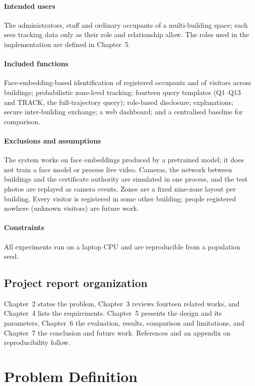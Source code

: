 \documentclass[12pt,a4paper,oneside]{report}
\begin{document}
\subsubsection{Intended users}
The administrators, staff and ordinary occupants of a multi-building space; each sees tracking data only as their role and relationship allow. The roles used in the implementation are defined in Chapter~5.

\subsubsection{Included functions}
Face-embedding-based identification of registered occupants and of visitors across buildings; probabilistic zone-level tracking; fourteen query templates (Q1--Q13 and TRACK, the full-trajectory query); role-based disclosure; explanations; secure inter-building exchange; a web dashboard; and a centralised baseline for comparison.

\subsubsection{Exclusions and assumptions}
The system works on face embeddings produced by a pretrained model; it does not train a face model or process live video. Cameras, the network between buildings and the certificate authority are simulated in one process, and the test photos are replayed as camera events. Zones are a fixed nine-zone layout per building. Every visitor is registered in some other building; people registered nowhere (unknown visitors) are future work.

\subsubsection{Constraints}
All experiments run on a laptop CPU and are reproducible from a population seed.

\section{Project report organization}
Chapter~2 states the problem, Chapter~3 reviews fourteen related works, and Chapter~4 lists the requirements. Chapter~5 presents the design and its parameters, Chapter~6 the evaluation, results, comparison and limitations, and Chapter~7 the conclusion and future work. References and an appendix on reproducibility follow.

\clearpage
\chapter{Problem Definition}
\end{document}
